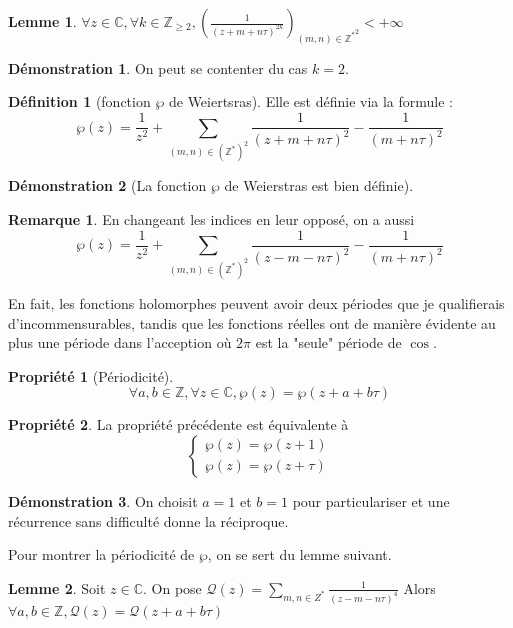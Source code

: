 \documentclass{article}
\newcommand{\C}{\mathbb{C}} %
\newcommand{\Z}{\mathbb{Z}} %
\theoremstyle{definition} %
\newtheorem{defi}{Définition}
\newtheorem{rmq}{Remarque}
\newtheorem{lem}{Lemme}
\newtheorem{dem}{Démonstration}
\newtheorem{propri}{Propriété}
\newcommand{\1}{\mathbb{1}} %
\begin{document}
\begin{lem}
$\forall z \in \C, \forall k \in \Z_{\geq 2}, \left( \frac{1}{(z + m + n \tau)^{2k}} \right)_{(m,n)\in {\Z^*}^2} < +\infty$
\end{lem}


\begin{dem}
On peut se contenter du cas $k=2$.
\end{dem}


\begin{defi}[fonction $\wp$ de Weiertsras]
    Elle est définie via la formule :
    $$\wp(z) = \frac{1}{z^2} + \sum_{(m,n) \in {(\Z^*)}^2 } \frac{1}{(z+m+n \tau)^2} -  \frac{1}{(m+n \tau)^2}$$

\end{defi}

\begin{dem}[La fonction $\wp$ de Weierstras est bien définie]
\end{dem}

\begin{rmq}
En changeant les indices en leur opposé, on a aussi
$$\wp(z)=\frac{1}{z^2} +  \sum_{(m,n) \in {(\Z^*)}^2 } \frac{1}{(z-m-n \tau)^2} -  \frac{1}{(m+n \tau)^2} $$
\end{rmq}

En fait, les fonctions holomorphes peuvent avoir deux périodes que je qualifierais d'incommensurables, tandis que les fonctions réelles ont de manière évidente au plus une période dans l'acception où $2\pi$ est la "seule" période de $\cos$.

\begin{propri}[Périodicité]
$$\forall a,b \in \Z, \forall z \in \C, \wp(z)=\wp(z + a + b \tau)$$
\end{propri}

\begin{propri}
La propriété précédente est équivalente à 
$$\begin{cases}
    \wp(z)=\wp(z+1) \\
    \wp(z)=\wp(z+\tau)
\end{cases}$$
\end{propri}

\begin{dem}
On choisit $a=1$ et $b=1$ pour particulariser et une récurrence sans difficulté donne la réciproque.
\end{dem}

Pour montrer la périodicité de $\wp$, on se sert du lemme suivant.

\begin{lem}
Soit $z \in \C$.
On pose $\mathcal{Q} (z)= \sum_{m,n \in Z^*} \frac{1}{(z - m -n \tau)^4}$
Alors $\forall a,b \in \Z, \mathcal{Q}(z)=\mathcal{Q}(z+a+ b \tau)$
\end{lem}
\end{document}
